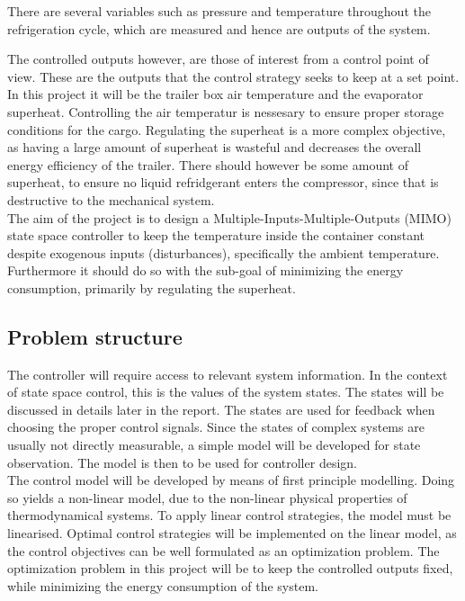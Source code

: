 There are several variables such as pressure and temperature throughout the refrigeration cycle, which are measured and hence are outputs of the system. 

The controlled outputs however, are those of interest from a control point of view. These are the outputs that the control strategy seeks to keep at a set point. In this project it will be the trailer box air temperature and the evaporator superheat. Controlling the air temperatur is nessesary to ensure proper storage conditions for the cargo. Regulating the superheat is a more complex objective, as having a large amount of superheat is wasteful and decreases the overall energy efficiency of the trailer. There should however be some amount of superheat, to ensure no liquid refridgerant enters the compressor, since that is destructive to the mechanical system.\\

The aim of the project is to design a Multiple-Inputs-Multiple-Outputs (MIMO) state space controller to keep the temperature inside the container constant despite exogenous inputs (disturbances), specifically the ambient temperature. Furthermore it should do so with the sub-goal of minimizing the energy consumption, primarily by regulating the superheat.

\subsection{Problem structure}

The controller will require access to relevant system information. In the context of state space control, this is the values of the system states. The states will be discussed in details later in the report. The states are used for feedback when choosing the proper control signals. Since the states of complex systems are usually not directly measurable, a simple model will be developed for state observation. The model is then to be used for controller design. \\

The control model will be developed by means of first principle modelling. Doing so yields a non-linear model, due to the non-linear physical properties of thermodynamical systems. To apply linear control strategies, the model must be linearised. Optimal control strategies will be implemented on the linear model, as the control objectives can be well formulated as an optimization problem. The optimization problem in this project will be to keep the controlled outputs fixed, while minimizing the energy consumption of the system.\\


		
